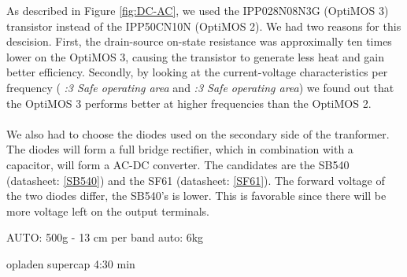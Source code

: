 \documentclass[final]{scrreprt} %
\begin{document}
As described in Figure \ref{fig:DC-AC}, we used the IPP028N08N3G (OptiMOS 3) transistor instead of the IPP50CN10N (OptiMOS 2).
We had two reasons for this descision.
First, the drain-source on-state resistance was approximally ten times lower on the OptiMOS 3, causing the transistor to generate less heat and gain better efficiency.
Secondly, by looking at the current-voltage characteristics per frequency (\cite{OptiMOS2} \emph{:3 Safe operating area} and \cite{OptiMOS3} \emph{:3 Safe operating area}) we found out that the OptiMOS 3 performs better at higher frequencies than the OptiMOS 2.
\\ \\
We also had to choose the diodes used on the secondary side of the tranformer. The diodes will form a full bridge rectifier, which in combination with a capacitor, will form a AC-DC converter.
The candidates are the SB540 (datasheet: \ref{SB540}) and the SF61 (datasheet: \ref{SF61}).
The forward voltage of the two diodes differ, the SB540's is lower. This is favorable since there will be more voltage left on the output terminals.


AUTO:
500g - 13 cm per band
auto: 6kg

opladen supercap 4:30 min
\end{document}
